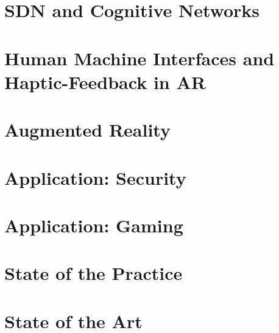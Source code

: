 \section{SDN and Cognitive Networks}


\section{Human Machine Interfaces and Haptic-Feedback in AR}


\section{Augmented Reality}


\section{Application: Security}


\section{Application: Gaming}


\section{State of the Practice}


\section{State of the Art}


